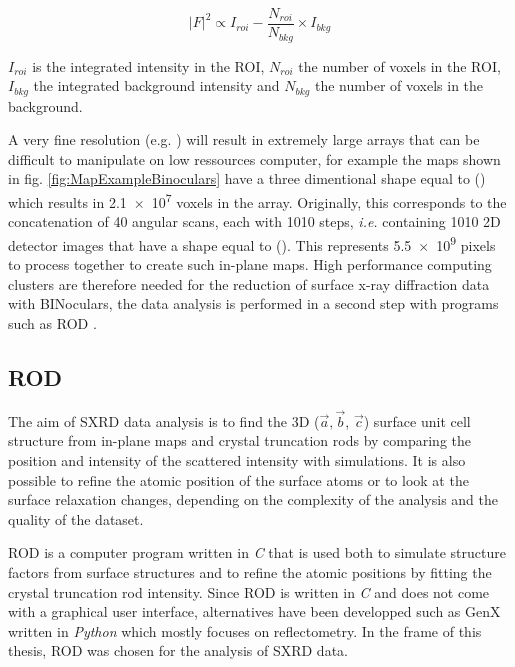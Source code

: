 \begin{equation}
    |F|^2 \propto I_{roi} - \frac{N_{roi}}{N_{bkg}} \times I_{bkg}
    \label{eq:BinocSF}
\end{equation}

$I_{roi}$ is the integrated intensity in the ROI, $N_{roi}$ the number of voxels in the ROI, $I_{bkg}$ the integrated background intensity and $N_{bkg}$ the number of voxels in the background.

A very fine resolution (e.g. ) will result in extremely large arrays that can be difficult to manipulate on low ressources computer, for example the maps shown in fig. \ref{fig:MapExampleBinoculars} have a three dimentional shape equal to () which results in \num{2.1e7} voxels in the array.
Originally, this corresponds to the concatenation of 40 angular scans, each with 1010 steps, \textit{i.e.} containing 1010 2D detector images that have a shape equal to ().
This represents \num{5.5e9} pixels to process together to create such in-plane maps.
High performance computing clusters are therefore needed for the reduction of surface x-ray diffraction data with BINoculars, the data analysis is performed in a second step with programs such as ROD \parencite{Vlieg2000}.

\subsection{ROD} \label{sec:ROD}

The aim of SXRD data analysis is to find the 3D ($\vec{a}, \vec{b}$, $\vec{c}$) surface unit cell structure from in-plane maps and crystal truncation rods by comparing the position and intensity of the scattered intensity with simulations.
It is also possible to refine the atomic position of the surface atoms or to look at the surface relaxation changes, depending on the complexity of the analysis and the quality of the dataset.

ROD is a computer program written in \textit{C} \parencite{Vlieg2000} that is used both to simulate structure factors from surface structures and to refine the atomic positions by fitting the crystal truncation rod intensity.
Since ROD is written in \textit{C} and does not come with a graphical user interface, alternatives have been developped such as GenX \parencite{Bjorck2007,Glavic2022} written in \textit{Python} which mostly focuses on reflectometry.
In the frame of this thesis, ROD was chosen for the analysis of SXRD data.

